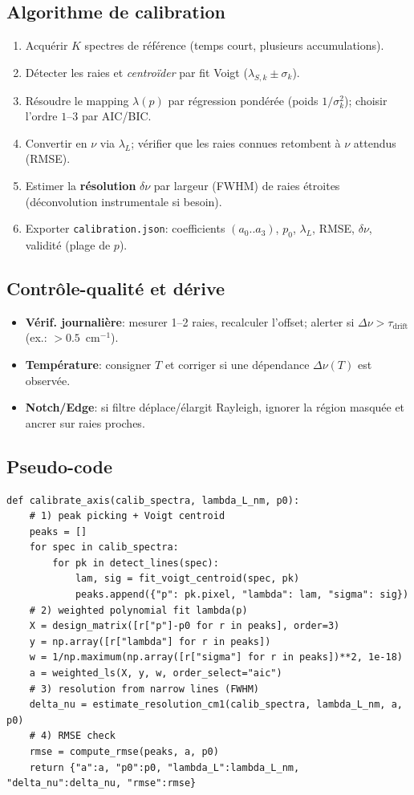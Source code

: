 \subsection{Algorithme de calibration}
\begin{enumerate}[nosep]
\item Acquérir $K$ spectres de référence (temps court, plusieurs accumulations).
\item Détecter les raies et \emph{centroïder} par fit Voigt ($\lambda_{S,k} \pm \sigma_k$).
\item Résoudre le mapping $\lambda(p)$ par régression pondérée (poids $1/\sigma_k^2$); choisir l'ordre $1$--$3$ par AIC/BIC.
\item Convertir en $\nu$ via $\lambda_L$; vérifier que les raies connues retombent à $\nu$ attendus (RMSE).
\item Estimer la \textbf{résolution} $\delta \nu$ par largeur (FWHM) de raies étroites (déconvolution instrumentale si besoin).
\item Exporter \texttt{calibration.json}: coefficients $(a_0..a_3)$, $p_0$, $\lambda_L$, RMSE, $\delta\nu$, validité (plage de $p$).
\end{enumerate}

\subsection{Contrôle-qualité et dérive}
\begin{itemize}[nosep]
\item \textbf{Vérif. journalière}: mesurer 1--2 raies, recalculer l'offset; alerter si $\Delta \nu > \tau_{\mathrm{drift}}$ (ex.: $>0.5$~cm$^{-1}$).
\item \textbf{Température}: consigner $T$ et corriger si une dépendance $\Delta \nu (T)$ est observée.
\item \textbf{Notch/Edge}: si filtre déplace/élargit Rayleigh, ignorer la région masquée et ancrer sur raies proches.
\end{itemize}

\subsection{Pseudo-code}
\begin{lstlisting}[basicstyle=\ttfamily\small]
def calibrate_axis(calib_spectra, lambda_L_nm, p0):
    # 1) peak picking + Voigt centroid
    peaks = []
    for spec in calib_spectra:
        for pk in detect_lines(spec):
            lam, sig = fit_voigt_centroid(spec, pk)
            peaks.append({"p": pk.pixel, "lambda": lam, "sigma": sig})
    # 2) weighted polynomial fit lambda(p)
    X = design_matrix([r["p"]-p0 for r in peaks], order=3)
    y = np.array([r["lambda"] for r in peaks])
    w = 1/np.maximum(np.array([r["sigma"] for r in peaks])**2, 1e-18)
    a = weighted_ls(X, y, w, order_select="aic")
    # 3) resolution from narrow lines (FWHM)
    delta_nu = estimate_resolution_cm1(calib_spectra, lambda_L_nm, a, p0)
    # 4) RMSE check
    rmse = compute_rmse(peaks, a, p0)
    return {"a":a, "p0":p0, "lambda_L":lambda_L_nm, "delta_nu":delta_nu, "rmse":rmse}
\end{lstlisting}

